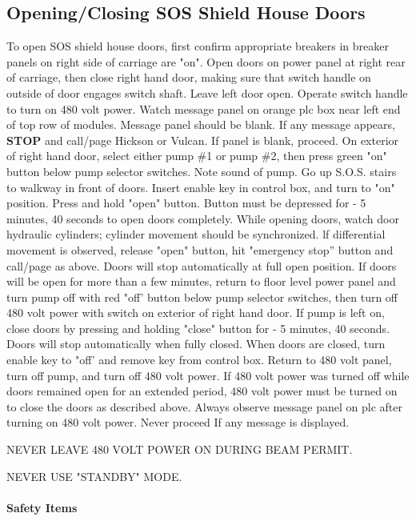 \begin{obsolete}
\subsection{Opening/Closing SOS Shield House Doors}

To open SOS shield house doors, first confirm appropriate breakers in
breaker panels on right side of carriage are "on". Open doors on power
panel at right rear of carriage, then close right hand door, making sure
that switch handle on outside of door engages switch shaft. Leave left door
open.
Operate switch handle to turn on 480 volt power. Watch message panel on
orange plc box near left end of top row of modules. Message panel should be
blank. If any message appears, {\bf STOP} and call/page Hickson or
Vulcan.  If panel is
blank, proceed. On exterior of right hand door, select either pump \#1 or
pump \#2, then press green "on" button below pump selector switches. Note
sound of pump. Go up S.O.S. stairs to walkway in front of doors. Insert
enable key in control box, and turn to "on" position. Press and hold "open"
button. Button must be depressed for - 5 minutes, 40 seconds to open doors
completely. While opening doors, watch door hydraulic cylinders; cylinder
movement should be synchronized. lf differential movement is observed,
release "open" button, hit "emergency stop'' button and call/page as 
above.  Doors will stop automatically at full open position.
If doors will be open for more than a few minutes, return to floor level
power panel and turn pump off with red "off' button below pump selector
switches, then turn off 480 volt power with switch on exterior of right
hand door. If pump is left on, close doors by pressing and holding "close"
button for - 5 minutes, 40 seconds. Doors will stop automatically when
fully closed.  When doors are closed, turn enable key to "off' and remove
key from control box. Return to 480 volt panel, turn off pump, and turn off
480 volt power. If 480 volt power was turned off while doors remained open
for an extended period, 480 volt power must be turned on to close the doors
as described above. Always observe message panel on plc after turning on
480 volt power. Never proceed If any message is displayed.

NEVER LEAVE 480 VOLT POWER ON DURING BEAM PERMIT.

NEVER USE "STANDBY" MODE.



\paragraph{Safety Items}


\end{obsolete}
